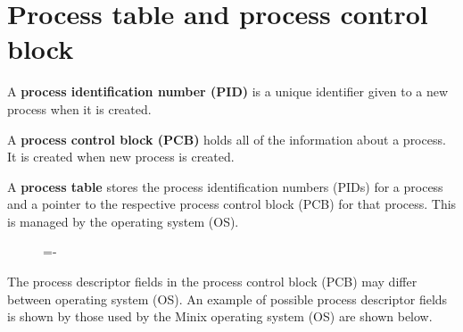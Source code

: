 \documentclass[a4paper]{systems-software}
\begin{document}
\section*{Process table and process control block}

A \textbf{process identification number (PID)} is a unique identifier given to a new process when it is created.

A \textbf{process control block (PCB)} holds all of the information about a process. It is created when new process is created.

A \textbf{process table} stores the process identification numbers (PIDs) for a process and a pointer to the respective process control block (PCB) for that process. This is managed by the operating system (OS).

\begin{figure}[H]
  \lineskip=-\fboxrule
\end{figure}

The process descriptor fields in the process control block (PCB) may differ between operating system (OS). An example of possible process descriptor fields is shown by those used by the Minix operating system (OS) are shown below.
\end{document}
